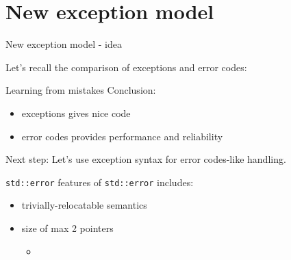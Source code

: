 \documentclass[10pt,a4paper]{beamer}
\begin{document}
\section{New exception model}
\begin{frame}{New exception model - idea}
	\begin{center}
		Let's recall the comparison of exceptions and error codes:
	\end{center}
	
	\begin{figure}
	\end{figure}
	
\end{frame}

\begin{frame}{Learning from mistakes}
	\centering
	Conclusion:
	
	\begin{itemize}
		\item exceptions gives nice code
		\item error codes provides performance and reliability
	\end{itemize}

	\begin{alertblock}{Next step:}
	Let's use exception syntax for error codes-like handling.
	\end{alertblock}
	
\end{frame}
	
\begin{frame}{\texttt{std::error}}
	features of \texttt{std::error} includes:
	\begin{itemize}
		\item trivially-relocatable semantics
		\item size of max 2 pointers
		\begin{itemize}
			\item 
		\end{itemize}
	\end{itemize}
\end{frame}
	
\end{document}
